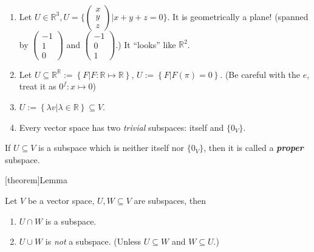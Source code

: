 \documentclass[12pt]{report}
\theoremstyle{definition}
\begin{document}
\begin{ex}
    \,

    \begin{enumerate}[label = (\arabic*)]
        \item Let $U \in \mathbb{R}^{3}, U = \{\begin{pmatrix}
                x \\
                y \\
                z
        \end{pmatrix} | x + y + z = 0\}$.
        It is geometrically a plane! (spanned by $\begin{pmatrix}
                -1 \\
                1 \\
                0
        \end{pmatrix}$ and $\begin{pmatrix}
                -1 \\
                0 \\
                1
            \end{pmatrix}$.) It ``looks'' like $\mathbb{R}^{2}$.

        \item Let $U \subseteq \mathbb{R}^{\mathbb{R}} 
            := \left\{F | F:\mathbb{R} \mapsto \mathbb{R}\right\}$,
            $U := \left\{F | F(\pi) = 0\right\} $.
            (Be careful with the $e$, treat it as $0^{f}:x\mapsto 0$)

        \item $U := \left\{\lambda v | \lambda \in \mathbb{R}\right\} \subseteq V $.

        \item Every vector space has two \emph{trivial} subspaces: itself and $\{0_V\}$.
    \end{enumerate}

    If $U \subseteq V$ is a subspace which is neither itself nor $\{0_V\}$, then
    it is called a \textbf{\emph{proper}} subspace.
\end{ex}

[theorem]{Lemma}
\begin{union and intersection of subspaces}
    Let $V$ be a vector space, $U, W \subseteq V$ are subspaces, then
    \begin{enumerate}[label = (\arabic*)]
        \item $U \cap W$ is a subspace.
        \item $U \cup W$ is \emph{not} a subspace.
            (Unless $U \subseteq W$ and $W \subseteq U$.)
    \end{enumerate}
\end{union and intersection of subspaces}
\end{document}
